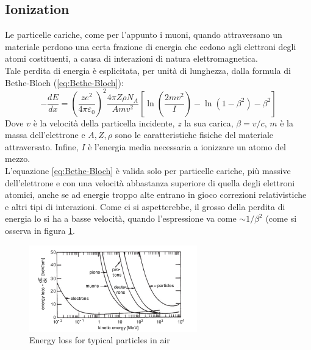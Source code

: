 \documentclass[a4paper,11pt]{book}
\begin{document}
\subsection{Ionization}
Le particelle cariche, come per l'appunto i muoni, quando attraversano un materiale perdono una certa frazione di energia che cedono agli elettroni degli atomi costituenti, a causa di interazioni di natura elettromagnetica.\\
Tale perdita di energia è esplicitata, per unità di lunghezza, dalla formula di Bethe-Bloch (\ref{eq:Bethe-Bloch}):
\begin{equation}
-\frac{dE}{dx} = \left(\frac{ze^2}{4\pi\varepsilon_0}\right)^2\frac{4\pi Z\rho N_A}{Amv^2}\left[\ln\left(\frac{2mv^2}{I}\right)-\ln(1-\beta^2)-\beta^2\right]
\label{eq:Bethe-Bloch}
\end{equation}
Dove $v$ è la velocità della particella incidente, $z$ la sua carica, $\beta = v/c$, $m$ è la massa dell'elettrone e $A,Z,\rho$ sono le caratteristiche fisiche del materiale attraversato. Infine, $I$ è l'energia media necessaria a ionizzare un atomo del mezzo.\\
L'equazione \ref{eq:Bethe-Bloch} è valida solo per particelle cariche, più massive dell'elettrone e con una velocità abbastanza superiore di quella degli elettroni atomici, anche se ad energie troppo alte entrano in gioco correzioni relativistiche e altri tipi di interazioni. Come ci si aspetterebbe, il grosso della perdita di energia lo si ha a basse velocità, quando l'espressione va come $\sim 1/\beta^2$ (come si osserva in figura \ref{fig:energy_loss_in_air}.\\
\begin{figure}[hbtp]
\centering
\includegraphics[scale=2]{pictures/particle_energy_loss_in_air.pdf}
\caption{Energy loss for typical particles in air}
\label{fig:energy_loss_in_air}
\end{figure}
\end{document}
